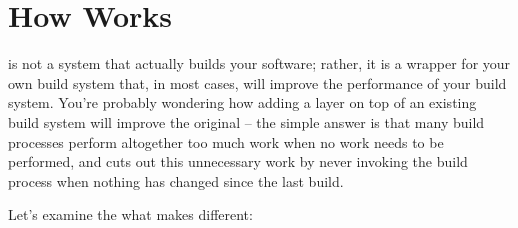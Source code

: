 \section{How \lmsbw Works}

\lmsbw is not a system that actually builds your software; rather, it
is a wrapper for your own build system that, in most cases, will
improve the performance of your build system.  You're probably
wondering how adding a layer on top of an existing build system will
improve the original -- the simple answer is that many build processes
perform altogether too much work when no work needs to be performed,
and \lmsbw cuts out this unnecessary work by never invoking the build
process when nothing has changed since the last build.

Let's examine the what makes \lmsbw different:

